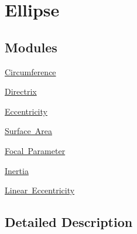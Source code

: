 \hypertarget{group___e_g_x_math-_geometry-2_d-_ellipse}{}\section{Ellipse}
\label{group___e_g_x_math-_geometry-2_d-_ellipse}
\subsection*{Modules}
\begin{DoxyCompactItemize}
\item 
\mbox{\hyperlink{group___e_g_x_math-_geometry-2_d-_ellipse-_circumference}{Circumference}}
\item 
\mbox{\hyperlink{group___e_g_x_math-_geometry-2_d-_ellipse-_directrix}{Directrix}}
\item 
\mbox{\hyperlink{group___e_g_x_math-_geometry-2_d-_ellipse-_eccentricity}{Eccentricity}}
\item 
\mbox{\hyperlink{group___e_g_x_math-_geometry-2_d-_ellipse-_surface_area}{Surface Area}}
\item 
\mbox{\hyperlink{group___e_g_x_math-_geometry-2_d-_ellipse-_focal_parameter}{Focal Parameter}}
\item 
\mbox{\hyperlink{group___e_g_x_math-_geometry-2_d-_ellipse-_inertia}{Inertia}}
\item 
\mbox{\hyperlink{group___e_g_x_math-_geometry-2_d-_ellipse-_linear_eccentricity}{Linear Eccentricity}}
\end{DoxyCompactItemize}


\subsection{Detailed Description}
